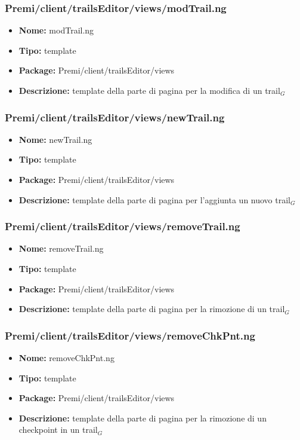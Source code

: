 \subsubsection{Premi/client/trailsEditor/views/modTrail.ng}
\begin{itemize}
  \item[] \textbf{Nome:} modTrail.ng
  \item[] \textbf{Tipo:} template
  \item[] \textbf{Package:} Premi/client/trailsEditor/views
  \item[] \textbf{Descrizione:}  template della parte di pagina per la modifica di un trail$_G$
\end{itemize}
\subsubsection{Premi/client/trailsEditor/views/newTrail.ng}
\begin{itemize}
  \item[] \textbf{Nome:} newTrail.ng
  \item[] \textbf{Tipo:} template
  \item[] \textbf{Package:} Premi/client/trailsEditor/views
  \item[] \textbf{Descrizione:}  template della parte di pagina per l'aggiunta un nuovo trail$_G$
\end{itemize}
\subsubsection{Premi/client/trailsEditor/views/removeTrail.ng}
\begin{itemize}
  \item[] \textbf{Nome:} removeTrail.ng
  \item[] \textbf{Tipo:} template
  \item[] \textbf{Package:} Premi/client/trailsEditor/views
  \item[] \textbf{Descrizione:}  template della parte di pagina per la rimozione di un trail$_G$
\end{itemize}
\subsubsection{Premi/client/trailsEditor/views/removeChkPnt.ng}
\begin{itemize}
  \item[] \textbf{Nome:} removeChkPnt.ng
  \item[] \textbf{Tipo:} template
  \item[] \textbf{Package:} Premi/client/trailsEditor/views
  \item[] \textbf{Descrizione:}  template della parte di pagina per la rimozione di un checkpoint in un trail$_G$
\end{itemize}
